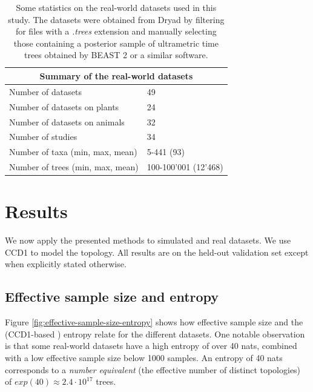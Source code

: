 \documentclass[10pt,letterpaper]{article}
\begin{document}
\begin{table}[H]
	\caption{Some statistics on the real-world datasets used in this study. The datasets were obtained from Dryad \cite{dryad} by filtering for files with a \emph{.trees} extension and manually selecting those containing a posterior sample of ultrametric time trees obtained by BEAST 2 or a similar software.}
	\label{table-bio-datasets}

	\centering
	\begin{tabular}{@{}ll@{}}
		\toprule
		\multicolumn{2}{c}{Summary of the real-world datasets} \\
		\midrule
		Number of datasets	& 49 \\
		Number of datasets on plants & 24 \\
		Number of datasets on animals & 32 \\
		Number of studies	& 34	 \\
		Number of taxa (min, max, mean) & 5-441 (93) \\
		Number of trees (min, max, mean) & 100-100'001 (12'468) \\
		\bottomrule
	\end{tabular}
\end{table}

\section*{Results}

We now apply the presented methods to simulated and real datasets. We use CCD1 to model the topology. All results are on the held-out validation set except when explicitly stated otherwise.

\subsection*{Effective sample size and entropy}

Figure \ref{fig:effective-sample-size-entropy} shows how effective sample size and the (CCD1-based \cite{ccdentropy}) entropy relate for the different datasets. One notable observation is that some real-world datasets have a high entropy of over 40 nats, combined with a low effective sample size below 1000 samples. An entropy of 40 nats corresponds to a \emph{number equivalent} (the effective number of distinct topologies) \cite{ccd} of $exp(40) \approx 2.4 \cdot 10^{17}$ trees.
\end{document}
